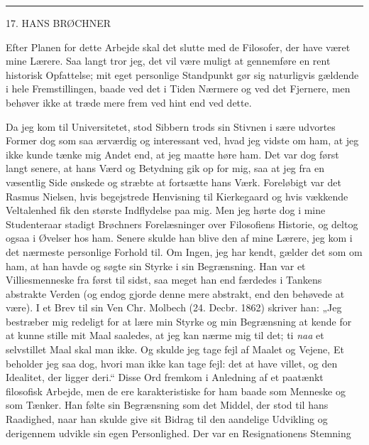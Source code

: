 \documentclass[12pt,a4paper,openany]{book}
\newcommand{\opage}[1]{\marginnote{\footnotesize\textit{[#1]}}}
\begin{document}
\begin{center}\rule{2cm}{0.4pt}\end{center}

\setcounter{footnote}{0}%
\opage{196}

\begin{center}\large 17. HANS BRØCHNER\end{center}

Efter Planen for dette Arbejde skal det slutte med de Filosofer, der have været
mine Lærere. Saa langt tror jeg, det vil være muligt at gennemføre en rent
historisk Opfattelse; mit eget personlige Standpunkt gør sig naturligvis
gældende i hele Fremstillingen, baade ved det i Tiden Nærmere og ved det
Fjernere, men behøver ikke at træde mere frem ved hint end ved dette.

Da jeg kom til Universitetet, stod Sibbern trods sin Stivnen i sære udvortes
Former dog som saa ærværdig og interessant ved, hvad jeg vidste om ham, at jeg
ikke kunde tænke mig Andet end, at jeg maatte høre ham. Det var dog først langt
senere, at hans Værd og Betydning gik op for mig, saa at jeg fra en væsentlig
Side ønskede og stræbte at fortsætte hans Værk. Foreløbigt var det Rasmus
Nielsen, hvis begejstrede Henvisning til Kierkegaard og hvis vækkende
Veltalenhed fik den største Indflydelse paa mig. Men jeg hørte dog i mine
Studenteraar stadigt Brøchners Forelæsninger over Filosofiens Historie, og
deltog ogsaa i Øvelser hos ham. Senere skulde han blive den af mine Lærere, jeg
kom i det nærmeste personlige Forhold til. Om Ingen, jeg har kendt, gælder det
som om ham, at han havde og søgte sin Styrke i sin Begrænsning. Han var et
Villiesmenneske fra først til sidst, saa meget han end færdedes i Tankens
abstrakte Verden (og endog gjorde denne mere abstrakt, end den behøvede at
være). I et Brev til sin Ven Chr. Molbech (24. Decbr. 1862) skriver han: „Jeg
bestræber mig redeligt for at lære min Styrke og min Begrænsning at kende for
at kunne stille
\setcounter{footnote}{0}%
\opage{197}mit Maal saaledes, at jeg kan nærme mig til det; ti \textit{naa} et
selvstillet Maal skal man ikke. Og skulde jeg tage fejl af Maalet og Vejene, Et
beholder jeg saa dog, hvori man ikke kan tage fejl: det at have villet, og den
Idealitet, der ligger deri.“ Disse Ord fremkom i Anledning af et paatænkt
filosofisk Arbejde, men de ere karakteristiske for ham baade som Menneske og
som Tænker. Han følte sin Begrænsning som det Middel, der stod til hans
Raadighed, naar han skulde give sit Bidrag til den aandelige Udvikling og
derigennem udvikle sin egen Personlighed. Der var en Resignationens Stemning
\end{document}
